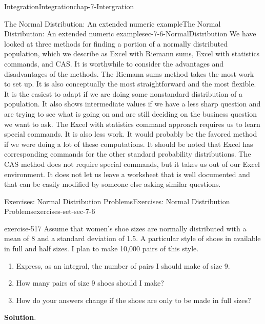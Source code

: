 \documentclass[oneside,10pt,]{book}
\numberwithin{equation}{section}
\begin{document}
\begin{chapterptx}{Integration}{}{Integration}{}{}{chap-7-Intergration}
\begin{sectionptx}{The Normal Distribution: An extended numeric example}{}{The Normal Distribution: An extended numeric example}{}{}{sec-7-6-NormalDistribution}
We have looked at three methods for finding a portion of a normally distributed population, which we describe as Excel with Riemann sums, Excel with statistics commands, and CAS.  It is worthwhile to consider the advantages and disadvantages of the methods.  The Riemann sums method takes the most work to set up.  It is also conceptually the most straightforward and the most flexible.  It is the easiest to adapt if we are doing some nonstandard distribution of a population.  It also shows intermediate values if we have a less sharp question and are trying to see what is going on and are still deciding on the business question we want to ask.  The Excel with statistics command approach requires us to learn special commands.  It is also less work.  It would probably be the favored method if we were doing a lot of these computations.  It should be noted that Excel has corresponding commands for the other standard probability distributions. The CAS method does not require special commands, but it takes us out of our Excel environment.  It does not let us leave a worksheet that is well documented and that can be easily modified by someone else asking similar questions.%
%
%
\typeout{************************************************}
\typeout{************************************************}
%
\begin{exercises-subsection-numberless}{Exercises: Normal Distribution Problems}{}{Exercises: Normal Distribution Problems}{}{}{exercises-set-sec-7-6}
\begin{divisionexercise}{1}{}{}{exercise-517}%
\hypertarget{p-2965}{}%
Assume that women’s shoe sizes are normally distributed with a mean of 8 and a standard deviation of 1.5.  A particular style of shoes in available in full and half sizes.  I plan to make 10,000 pairs of this style.%
\leavevmode%
\begin{enumerate}[label=(\alph*)]
\textgreater{} \item\hypertarget{li-771}{}\hypertarget{p-2966}{}%
Express, as an integral, the number of pairs I should make of size 9.%
\item\hypertarget{li-772}{}\hypertarget{p-2967}{}%
How many pairs of size 9 shoes should I make?%
\item\hypertarget{li-773}{}\hypertarget{p-2968}{}%
How do your answers change if the shoes are only to be made in full sizes?%
\end{enumerate}
\par\smallskip%
\noindent\textbf{Solution}.\hypertarget{solution-262}{}\quad%

\end{divisionexercise}
\end{exercises-subsection-numberless}
\end{sectionptx}
\end{chapterptx}
\end{document}
